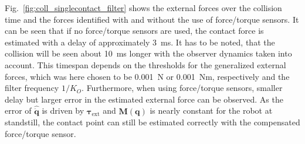 Fig.~\ref{fig:coll_singlecontact_filter} shows the external forces over the collision time and the forces identified with and without the use of force/torque sensors.
It can be seen that if no force/torque sensors are used, the contact force is estimated with a delay of approximately 3~ms.
It has to be noted, that the collision will be seen about 10~ms longer with the observer dynamics taken into account.
This timespan depends on the thresholds for the generalized external forces, which was here chosen to be 0.001~N or 0.001~Nm, respectively and the filter frequency $1/K_O$.
Furthermore, when using force/torque sensors, smaller delay but larger error in the estimated external force can be observed.
As the error of $\hat{\ddot{\bm{q}}}$ is driven by $\bm{\tau}_\mathrm{ext}$ and $\bm{M}(\bm{q})$ is nearly constant for the robot at standstill, the contact point can still be estimated correctly with the compensated force/torque sensor.

